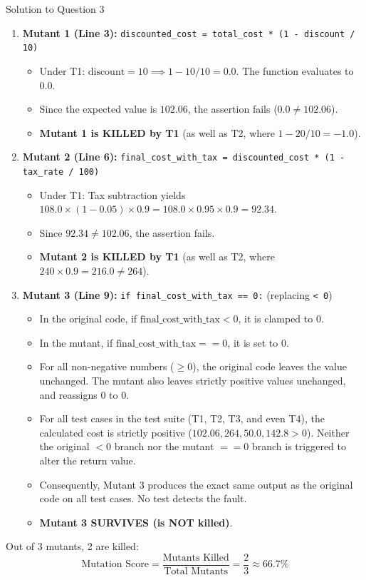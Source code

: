 \documentclass[11pt,a4paper]{article}
\begin{document}
\begin{solutionbox}{Solution to Question 3}
\begin{enumerate}[label=\textbf{\arabic*.}]
    \item \textbf{Mutant 1 (Line 3):} \texttt{discounted\_cost = total\_cost * (1 - discount / 10)}
    \begin{itemize}
        \item Under T1: $\text{discount} = 10 \implies 1 - 10/10 = 0.0$. The function evaluates to $0.0$.
        \item Since the expected value is $102.06$, the assertion fails ($0.0 \neq 102.06$).
        \item \textbf{Mutant 1 is KILLED by T1} (as well as T2, where $1 - 20/10 = -1.0$).
    \end{itemize}

    \item \textbf{Mutant 2 (Line 6):} \texttt{final\_cost\_with\_tax = discounted\_cost * (1 - tax\_rate / 100)}
    \begin{itemize}
        \item Under T1: Tax subtraction yields $108.0 \times (1 - 0.05) \times 0.9 = 108.0 \times 0.95 \times 0.9 = 92.34$.
        \item Since $92.34 \neq 102.06$, the assertion fails.
        \item \textbf{Mutant 2 is KILLED by T1} (as well as T2, where $240 \times 0.9 = 216.0 \neq 264$).
    \end{itemize}

    \item \textbf{Mutant 3 (Line 9):} \texttt{if final\_cost\_with\_tax == 0:} (replacing \texttt{< 0})
    \begin{itemize}
        \item In the original code, if $\text{final\_cost\_with\_tax} < 0$, it is clamped to $0$.
        \item In the mutant, if $\text{final\_cost\_with\_tax} == 0$, it is set to $0$.
        \item For all non-negative numbers ($\ge 0$), the original code leaves the value unchanged. The mutant also leaves strictly positive values unchanged, and reassigns $0$ to $0$.
        \item For all test cases in the test suite (T1, T2, T3, and even T4), the calculated cost is strictly positive ($102.06, 264, 50.0, 142.8 > 0$). Neither the original $<0$ branch nor the mutant $==0$ branch is triggered to alter the return value.
        \item Consequently, Mutant 3 produces the exact same output as the original code on all test cases. No test detects the fault.
        \item \textbf{Mutant 3 SURVIVES (is NOT killed)}.
    \end{itemize}
\end{enumerate}

Out of 3 mutants, 2 are killed:
\[
\text{Mutation Score} = \frac{\text{Mutants Killed}}{\text{Total Mutants}} = \frac{2}{3} \approx 66.7\%
\]
\end{solutionbox}
\end{document}
